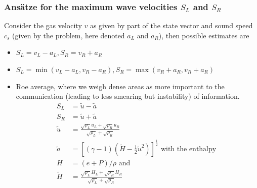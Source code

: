 \subsubsection{Ansätze for the maximum wave velocities $S_L$ and $S_R$}
Consider the gas velocity $v$ as given by part of the state vector and
sound speed $c_s$ (given by the problem, here denoted $a_L$ and $a_R$), then
possible estimates are
\begin{itemize}
    \item $S_L = v_L - a_L, S_R = v_R + a_R$
    \item $S_L = \min(v_L - a_L, v_R - a_R), S_R = \max(v_R + a_R, v_R + a_R)$
    \item Roe average, where we weigh dense areas as more important to the communication (leading to less smearing but \textcolor{red1}{instability})
          of information.
          \begin{equation}
            \begin{aligned}
            S_L & =\tilde{u}-\tilde{a} \\
            S_R & =\tilde{u}+\tilde{a} \\
            \tilde{u} & =\frac{\sqrt{\rho_L} u_L+\sqrt{\rho_R} u_R}{\sqrt{\rho_L}+\sqrt{\rho_R}} \\
            \tilde{a} & =\left[(\gamma-1)\left(\widetilde{H}-\frac{1}{2} \tilde{u}^2\right)\right]^{\frac{1}{2}} \text { with the enthalpy } \\
            H & =(e+P) / \rho \text { and } \\
            \widetilde{H} & =\frac{\sqrt{\rho_L} H_L+\sqrt{\rho_R} H_R}{\sqrt{\rho_L}+\sqrt{\rho_R}}
            \end{aligned}
        \end{equation}
\end{itemize}

